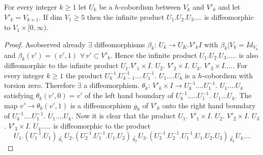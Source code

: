 \setcounter{lemma}{2}
 \begin{lemma}\label{chap2:lem5.3} %
 For every integer $k \geq 1$ let $U_k$ be a $h$-cobordism between
 $V_k$ and $V'_k$ and let $V'_k= V_{k+1}$. If dim $V_1 \geq 5$ then
 the infinite product $U_1. U_2. U_3. \ldots$ is diffeomorphic to $V_1
 \times [0, \infty)$. 
\end{lemma} 

\begin{proof}
As\pageoriginale observed already $\exists$ diffeomorphisms $\beta_k$:
$U_k \to 
U_K. V'_k I$ with $\beta_k | V_k=Id_{V_k}$ and $\beta_k (v') = (v',
1)$ $\forall \,  v' \subset V'_k$. Hence the infinite product
$U_1. U_2. U_3. \ldots$. is also diffeomorphic to the infinite
product $U_1. V'_1 \times I$. $U_2$. $V'_2 \times I$. $U_3$. $V'_3
\times I. \ldots$. For every integer $k \geq 1$ the product
$U_k^{-1}. U_{k-1}^{-1}. \ldots U_1^{-1}$. $U_1. \ldots U_k$ is a
$h$-cobordism with torsion zero. Therefore $\exists$ a
diffeomorphism. $\theta_k$: $V'_k \times I \to U^{-1}_k \ldots. U_1
^{-1}$. $U_1. \ldots U_k$ satisfying $\theta_k (v', 0) = v'$ of the
left hand boundary of $U^{-1}_k. \ldots . U_1 ^{-1}$. $U_1 \ldots
U_k$. The map $v' \to \theta_k (v', 1)$ is a diffeomorphism $g_k$ of
$V'_k$ onto the right hand boundary of $U_k^{-1}. \ldots
U_1^{-1}$. $U_1. \ldots U_k$. Now it is clear that the product
$U_1$. $V'_1 \times I$. $U_2$. $V'_2 \times I$. $U_3$. $V'_3 \times
I$. $U_4 . \ldots. $ is diffeomorphic to the product  
{\fontsize{10}{12}\selectfont
$$
U_1. (U_1^{-1}. U_1) \underset{g_1}{\cdot}  U_2. (U_2^{-1}. U_1
^{-1}. U_1. U_2) \underset{g_2}{\cdot}  U_3. (U_3^{-1}. U_2^{-1}. U_1
^{-1}. U_1. U_2. U_3) \underset{g_3}{\cdot} U_4 \ldots. 
$$} 


\end{proof}
